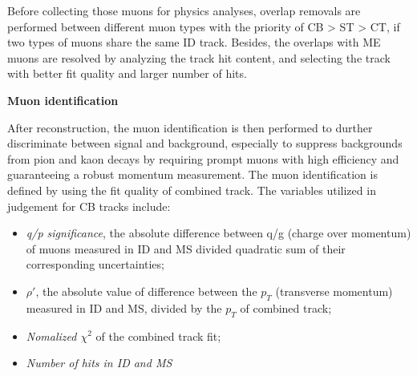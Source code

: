 Before collecting those muons for physics analyses, overlap removals are performed between different muon types with the priority of CB > ST > CT, if two types of muons share the same ID track.
Besides, the overlaps with ME muons are resolved by analyzing the track hit content, and selecting the track with better fit quality and larger number of hits.

\textbf{Muon identification}

After reconstruction, the muon identification is then performed to durther discriminate between signal and background, especially to suppress backgrounds from pion and kaon decays by requiring prompt muons with high efficiency and guaranteeing a robust momentum measurement.
The muon identification is defined by using the fit quality of combined track. 
The variables utilized in judgement for CB tracks include:
\begin{itemize}
	\item \textit{q/p significance}, the absolute difference between q/g (charge over momentum) of muons measured in ID and MS divided quadratic sum of their corresponding uncertainties;
	\item \textit{$\rho'$}, the absolute value of difference between the $p_{T}$ (transverse momentum) measured in ID and MS, divided by the $p_{T}$ of combined track;
	\item \textit{Nomalized $\chi^{2}$} of the combined track fit;
	\item \textit{Number of hits in ID and MS}
\end{itemize}

